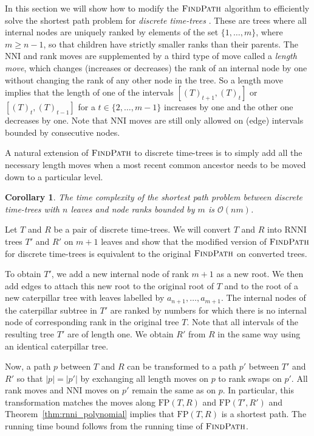 \documentclass[11pt]{amsart}
\newtheorem{corollary}{Corollary}
\newcommand{\rnni}{\mathrm{RNNI}}
\newcommand{\findpath}{\textsc{FindPath}}
\newcommand{\nni}{\mathrm{NNI}}
\newcommand{\fp}{\mathrm{FP}}
\renewcommand{\O}{\mathcal O}
\newcommand{\summary}[1]{} %
\begin{document}
\summary{Generalising $\findpath$ for discrete time-trees}
In this section we will show how to modify the $\findpath$ algorithm to efficiently solve the shortest path problem for \emph{discrete time-trees} \autocite{Gavryushkin2018-ol}.
These are trees where all internal nodes are uniquely ranked by elements of the set $\{1, \ldots, m\}$, where $m \geq n - 1$, so that children have strictly smaller ranks than their parents.
The NNI and rank moves are supplemented by a third type of move called a \emph{length move}, which changes (increases or decreases) the rank of an internal node by one without changing the rank of any other node in the tree.
So a length move implies that the length of one of the intervals $[(T)_{t+1},(T)_t]$ or $[(T)_t,(T)_{t-1}]$ for a $t \in \{2, \ldots, m-1\}$ increases by one and the other one decreases by one.
Note that $\nni$ moves are still only allowed on (edge) intervals bounded by consecutive nodes.

A natural extension of $\findpath$ to discrete time-trees is to simply add all the necessary length moves when a most recent common ancestor needs to be moved down to a particular level.
\begin{corollary}
The time complexity of the shortest path problem between discrete time-trees with $n$ leaves and node ranks bounded by $m$ is $\O(nm)$.
\label{cor:fp_dtt}
\end{corollary}

\proof
Let $T$ and $R$ be a pair of discrete time-trees.
We will convert $T$ and $R$ into $\rnni$ trees $T'$ and $R'$ on $m + 1$ leaves and show that the modified version of $\findpath$ for discrete time-trees is equivalent to the original $\findpath$ on converted trees.

To obtain $T'$, we add a new internal node of rank $m + 1$ as a new root.
We then add edges to attach this new root to the original root of $T$ and to the root of a new caterpillar tree with leaves labelled by $a_{n + 1}, \ldots, a_{m + 1}$.
The internal nodes of the caterpillar subtree in $T'$ are ranked by numbers for which there is no internal node of corresponding rank in the original tree $T$.
Note that all intervals of the resulting tree $T'$ are of length one.
We obtain $R'$ from $R$ in the same way using an identical caterpillar tree.

Now, a path $p$ between $T$ and $R$ can be transformed to a path $p'$ between $T'$ and $R'$ so that $|p| = |p'|$ by exchanging all length moves on $p$ to rank swaps on $p'$.
All rank moves and $\nni$ moves on $p'$ remain the same as on $p$.
In particular, this transformation matches the moves along $\fp(T,R)$ and $\fp(T',R')$ and Theorem~\ref{thm:rnni_polynomial} implies that $\fp(T, R)$ is a shortest path.
The running time bound follows from the running time of $\findpath$.
\endproof
\end{document}
